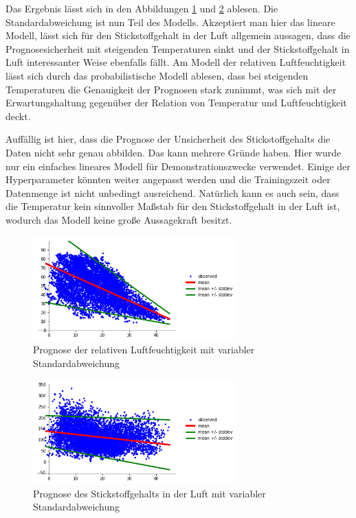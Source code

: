 \documentclass[12pt]{article}
\begin{document}
Das Ergebnis lässt sich in den Abbildungen \ref{fig:with_unc_rh} und \ref{fig:with_unc_no2} ablesen. Die Standardabweichung ist nun Teil des Modells. Akzeptiert man hier das lineare Modell, lässt sich für den Stickstoffgehalt in der Luft allgemein aussagen, dass die Prognosesicherheit mit steigenden Temperaturen sinkt und der Stickstoffgehalt in Luft interessanter Weise ebenfalls fällt. Am Modell der relativen Luftfeuchtigkeit  lässt sich durch das probabilistische Modell ablesen, dass bei steigenden Temperaturen die Genauigkeit der Prognosen stark zunimmt, was sich mit der Erwartungshaltung gegenüber der Relation von Temperatur und Luftfeuchtigkeit deckt.

Auffällig ist hier, dass die Prognose der Unsicherheit des Stickstoffgehalts die Daten nicht sehr genau abbilden. Das kann mehrere Gründe haben. Hier wurde nur ein einfaches lineares Modell für Demonstrationszwecke verwendet. Einige der Hyperparameter könnten weiter angepasst werden und die Trainingszeit oder Datenmenge ist nicht unbedingt ausreichend. Natürlich kann es auch sein, dass die Temperatur kein sinnvoller Maßstab für den Stickstoffgehalt in der Luft ist, wodurch das Modell keine große Aussagekraft besitzt. 

\begin{figure}[h]
    \centering
    \includegraphics[width=0.7\textwidth]{./figs/with_unc_rh.png}
    \caption{Prognose der relativen Luftfeuchtigkeit mit variabler Standardabweichung}
    \label{fig:with_unc_rh}
\end{figure}

\begin{figure}[h]
    \centering
    \includegraphics[width=0.7\textwidth]{./figs/with_unc_no2.png}
    \caption{Prognose des Stickstoffgehalts in der Luft mit variabler Standardabweichung}
    \label{fig:with_unc_no2}
\end{figure}
\end{document}
